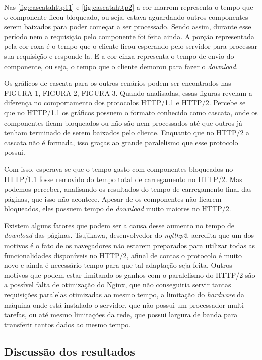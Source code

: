 Nas \autoref{fig:cascatahttp11} e \autoref{fig:cascatahttp2} a cor marrom representa o tempo que o componente ficou bloqueado, ou seja, estava aguardando outros componentes serem baixados para poder começar a ser processado. Sendo assim, durante esse período nem a requisição pelo componente foi feita ainda. A porção representada pela cor roxa é o tempo que o cliente ficou esperando pelo servidor para processar sua requisição e responde-la. E a cor cinza representa o tempo de envio do componente, ou seja, o tempo que o cliente demorou para fazer o \textit{download}.

Os gráficos de cascata para os outros cenários podem ser encontrados nas FIGURA 1, FIGURA 2, FIGURA 3. Quando analisadas, essas figuras revelam a diferença no comportamento dos protocolos HTTP/1.1 e HTTP/2. Percebe se que no HTTP/1.1 os gráficos possuem o formato conhecido como cascata, onde os componentes ficam bloqueados ou não são nem processados até que outros já tenham terminado de serem baixados pelo cliente. Enquanto que no HTTP/2 a cascata não é formada, isso graças ao grande paralelismo que esse protocolo possui.

Com isso, esperava-se que o tempo gasto com componentes bloqueados no HTTP/1.1 fosse removido do tempo total de carregamento no HTTP/2. Mas podemos perceber, analisando os resultados do tempo de carregamento final das páginas, que isso não acontece. Apesar de os componentes não ficarem bloqueados, eles possuem tempo de \textit{download} muito maiores no HTTP/2.

Existem alguns fatores que podem ser a causa desse aumento no tempo de \textit{download} das páginas. Tsujikawa, desenvolvedor do \textit{ngtthp2}, acredita que um dos motivos é o fato de os navegadores não estarem preparados para utilizar todas as funcionalidades disponíveis no HTTP/2, afinal de contas o protocolo é muito novo e ainda é necessário tempo para que tal adaptação seja feita. Outros motivos que podem estar limitando os ganhos com o paralelismo do HTTP/2 são a possível falta de otimização do Nginx, que não conseguiria servir tantas requisições paralelas otimizadas ao mesmo tempo, a limitação do \textit{hardware} da máquina onde está instalado o servidor, que não possui um processador multi-tarefas, ou até mesmo limitações da rede, que possui largura de banda para transferir tantos dados ao mesmo tempo.

\subsection{Discussão dos resultados}
\label{discussaodosresultados}

